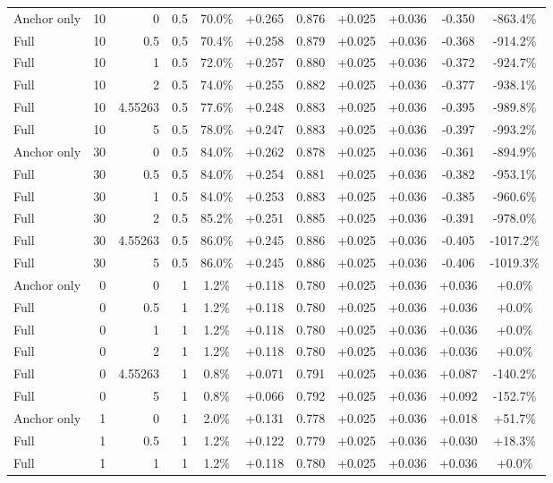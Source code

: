 \begin{table}[htbp]
\begin{tabular}{lrrrccccccc}
Anchor only & 10 & 0 & 0.5 & 70.0\% & +0.265 & 0.876 & +0.025 & +0.036 & -0.350 & -863.4\% \\
Full & 10 & 0.5 & 0.5 & 70.4\% & +0.258 & 0.879 & +0.025 & +0.036 & -0.368 & -914.2\% \\
Full & 10 & 1 & 0.5 & 72.0\% & +0.257 & 0.880 & +0.025 & +0.036 & -0.372 & -924.7\% \\
Full & 10 & 2 & 0.5 & 74.0\% & +0.255 & 0.882 & +0.025 & +0.036 & -0.377 & -938.1\% \\
Full & 10 & 4.55263 & 0.5 & 77.6\% & +0.248 & 0.883 & +0.025 & +0.036 & -0.395 & -989.8\% \\
Full & 10 & 5 & 0.5 & 78.0\% & +0.247 & 0.883 & +0.025 & +0.036 & -0.397 & -993.2\% \\
Anchor only & 30 & 0 & 0.5 & 84.0\% & +0.262 & 0.878 & +0.025 & +0.036 & -0.361 & -894.9\% \\
Full & 30 & 0.5 & 0.5 & 84.0\% & +0.254 & 0.881 & +0.025 & +0.036 & -0.382 & -953.1\% \\
Full & 30 & 1 & 0.5 & 84.0\% & +0.253 & 0.883 & +0.025 & +0.036 & -0.385 & -960.6\% \\
Full & 30 & 2 & 0.5 & 85.2\% & +0.251 & 0.885 & +0.025 & +0.036 & -0.391 & -978.0\% \\
Full & 30 & 4.55263 & 0.5 & 86.0\% & +0.245 & 0.886 & +0.025 & +0.036 & -0.405 & -1017.2\% \\
Full & 30 & 5 & 0.5 & 86.0\% & +0.245 & 0.886 & +0.025 & +0.036 & -0.406 & -1019.3\% \\
Anchor only & 0 & 0 & 1 & 1.2\% & +0.118 & 0.780 & +0.025 & +0.036 & +0.036 & +0.0\% \\
Full & 0 & 0.5 & 1 & 1.2\% & +0.118 & 0.780 & +0.025 & +0.036 & +0.036 & +0.0\% \\
Full & 0 & 1 & 1 & 1.2\% & +0.118 & 0.780 & +0.025 & +0.036 & +0.036 & +0.0\% \\
Full & 0 & 2 & 1 & 1.2\% & +0.118 & 0.780 & +0.025 & +0.036 & +0.036 & +0.0\% \\
Full & 0 & 4.55263 & 1 & 0.8\% & +0.071 & 0.791 & +0.025 & +0.036 & +0.087 & -140.2\% \\
Full & 0 & 5 & 1 & 0.8\% & +0.066 & 0.792 & +0.025 & +0.036 & +0.092 & -152.7\% \\
Anchor only & 1 & 0 & 1 & 2.0\% & +0.131 & 0.778 & +0.025 & +0.036 & +0.018 & +51.7\% \\
Full & 1 & 0.5 & 1 & 1.2\% & +0.122 & 0.779 & +0.025 & +0.036 & +0.030 & +18.3\% \\
Full & 1 & 1 & 1 & 1.2\% & +0.118 & 0.780 & +0.025 & +0.036 & +0.036 & +0.0\% \\

\end{tabular}
\end{table}
